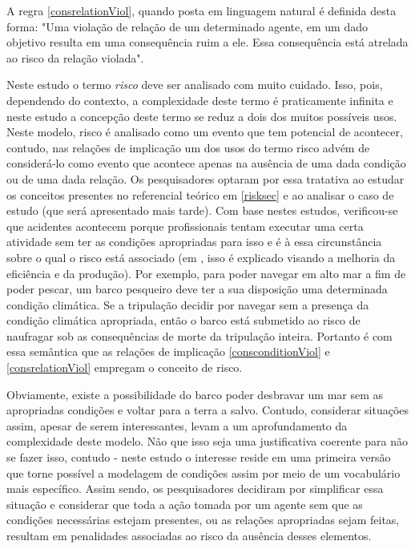 A regra \ref{consrelationViol}, quando posta em linguagem natural é definida desta forma: "Uma violação de relação de um determinado agente, em um dado objetivo resulta em uma consequência ruim a ele. Essa consequência está atrelada ao risco da relação violada". 

Neste estudo o termo \textit{risco} deve ser analisado com muito cuidado. Isso, pois, dependendo do contexto, a complexidade deste termo é praticamente infinita e neste estudo a concepção deste termo se reduz a dois dos muitos possíveis usos. Neste modelo, risco é analisado como um evento que tem potencial de acontecer, contudo, nas relações de implicação um dos usos do termo risco advém de considerá-lo como evento que acontece apenas na ausência de uma dada condição ou de uma dada relação. Os pesquisadores optaram por essa tratativa ao estudar os conceitos presentes no referencial teórico em \ref{risksec} e ao analisar o caso de estudo (que será apresentado mais tarde). Com base nestes estudos, verificou-se que acidentes acontecem porque profissionais tentam executar uma certa atividade sem ter as condições apropriadas para isso e é à essa circunstância sobre o qual o risco está associado (em \cite{safety}, isso é explicado visando a melhoria da eficiência e da produção). Por exemplo, para poder navegar em alto mar a fim de poder pescar, um barco pesqueiro deve ter a sua disposição uma determinada condição climática. Se a tripulação decidir por navegar sem a presença da condição climática apropriada, então o barco está submetido ao risco de naufragar sob as consequências de morte da tripulação inteira. Portanto é com essa semântica que as relações de implicação \ref{consconditionViol} e \ref{consrelationViol} empregam o conceito de risco. 

Obviamente, existe a possibilidade do barco poder desbravar um mar sem as apropriadas condições e voltar para a terra a salvo. Contudo, considerar situações assim, apesar de serem interessantes, levam a um aprofundamento da complexidade deste modelo. Não que isso seja uma justificativa coerente para não se fazer isso, contudo - neste estudo o interesse reside em uma primeira versão que torne possível a modelagem de condições assim por meio de um vocabulário mais específico. Assim sendo, os pesquisadores decidiram por simplificar essa situação e considerar que toda a ação tomada por um agente sem que as condições necessárias estejam presentes, ou as relações apropriadas sejam feitas, resultam em penalidades associadas ao risco da ausência desses elementos.  

